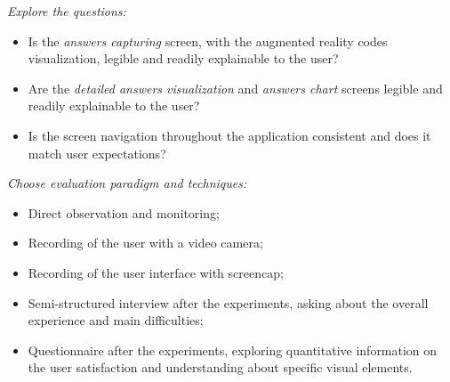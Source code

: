 \emph{Explore the questions:}
\begin{itemize}
    \item Is the \textit{answers capturing} screen, with the augmented reality codes visualization, legible and readily explainable to the user?

    \item Are the \textit{detailed answers visualization} and \textit{answers chart} screens legible and readily explainable to the user?

    \item Is the screen navigation throughout the application consistent and does it match user expectations?
\end{itemize}

\emph{Choose evaluation paradigm and techniques:}


\begin{itemize}
    \item Direct observation and monitoring;

    \item Recording of the user with a video camera;

    \item Recording of the user interface with screencap;

    \item Semi-structured interview after the experiments, asking about the overall experience and main difficulties;

    \item Questionnaire after the experiments, exploring quantitative information on the user satisfaction and understanding about specific visual elements.
\end{itemize}



